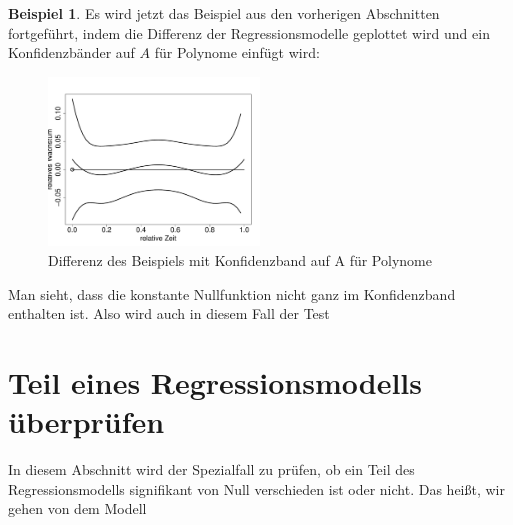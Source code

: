 \documentclass[12pt,a4paper]{article}
\theoremstyle{definition}
\newtheorem{Beispiel}[Definition]{Beispiel}
\theoremstyle{definition}
\theoremstyle{definition}
\theoremstyle{definition}
\begin{document}

\begin{Beispiel}
Es wird jetzt das Beispiel aus den vorherigen Abschnitten fortgeführt, indem die Differenz der Regressionsmodelle geplottet wird und ein Konfidenzbänder auf $A$ für Polynome einfügt wird:

\begin{figure}[H] 
  \centering
     \includegraphics[width=0.5\textwidth]{Bsp-KB-poly-hetero}
  \caption{Differenz des Beispiels mit Konfidenzband auf A für Polynome}
  \label{KB-poly-hetero-BSP}
\end{figure}

Man sieht, dass die konstante Nullfunktion nicht ganz im Konfidenzband enthalten ist. Also wird auch in diesem Fall der Test 

\end{Beispiel}


%
%


\newpage
\section{Teil eines Regressionsmodells überprüfen}
\label{Teil eines Regressionsmodells überprüfen}
In diesem Abschnitt wird der Spezialfall zu prüfen, ob ein Teil des Regressionsmodells signifikant von Null verschieden ist oder nicht.  Das heißt, wir gehen von dem Modell
\end{document}
